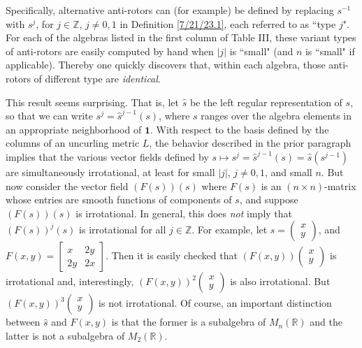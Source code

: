 \documentclass{amsart}
\numberwithin{equation}{section}
\theoremstyle{definition}
\numberwithin{theorem}{section}
\begin{document}
  Specifically, alternative anti-rotors can (for example) be defined by replacing $s^{-1}$ with $s^j$, for $j\in\mathbb{Z}$, $j\ne 0,1$ in Definition \ref{7/21/23.1}, each referred to as ``type $j$".  For each of the algebras listed in the first column of Table III, these variant types of anti-rotors are easily computed by hand when  $|j|$ is ``small" (and $n$ is ``small" if applicable).  
Thereby one quickly discovers that, within each algebra, those anti-rotors of different type are {\it identical}.  

This result seems surprising.  That is, let $\hat{s}$ be the left regular representation of $s$, so that we can write $s^j = \hat{s}^{j-1}(s)$, where $s$ ranges over the algebra elements in an appropriate neighborhood of $\mathbf{1}$. With respect to the basis defined by the columns of an uncurling metric $L$, the behavior described in the prior paragraph implies that the various vector fields defined by \mbox{$s\mapsto s^j = \hat{s}^{j-1}(s) = \hat{s}(s^{j-1})$} are simultaneously irrotational, at least for small $|j|$, $j\ne 0,1$, and small $n$.  But now consider the vector field $(F(s))(s)$ where $F(s)$ is an $(n\times n)$-matrix whose entries are smooth functions of components of $s$, and suppose $(F(s))(s)$ is \mbox{irrotational}.  In general, this does {\it not} imply that $(F(s))^j(s)$ is irrotational for all $j\in\mathbb{Z}$. For example, let \mbox{$s=\left(\begin{array}{ccc}
 x   \\ 
y    
\end{array}\right)$,} and \mbox{$F(x,y)= \left[\begin{array}{ccc}
x  & 2y   \\ 
 2y & 2x    
\end{array}\right]$.}  Then it is easily checked that $(F(x,y))\left(\begin{array}{ccc}
 x   \\ 
y    
\end{array}\right)$ is \mbox{irrotational} and, interestingly, $(F(x,y))^2\left(\begin{array}{ccc}
 x   \\ 
y    
\end{array}\right)$ is also irrotational.  But $(F(x,y))^3\left(\begin{array}{ccc}
 x   \\ 
y    
\end{array}\right)$ is not irrotational.  Of course, an important distinction between $\hat{s}$ and $F(x,y)$ is that the former is a subalgebra of $M_n(\mathbb{R})$ and the latter is not a subalgebra of $M_2(\mathbb{R})$.
\end{document}
